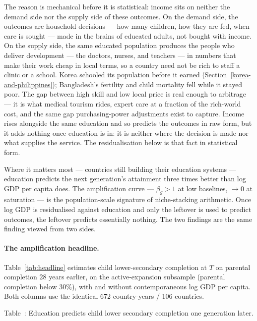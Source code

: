 \documentclass[12pt,letterpaper]{article}
\begin{document}
The reason is mechanical before it is statistical: income sits on
neither the demand side nor the supply side of these outcomes. On the demand side, the outcomes are
household decisions --- how many children, how they are fed, when care is
sought --- made in the brains of educated adults, not bought with income.
On the supply side, the same educated population produces the people who
deliver development --- the doctors, nurses, and teachers --- in numbers
that make their work cheap in local terms, so a country need not be rich
to staff a clinic or a school. Korea schooled its population before it
earned (Section~\ref{korea-and-philippines}); Bangladesh's fertility and
child mortality fell while it stayed poor. The gap between high skill and
low local price is real enough to arbitrage --- it is what medical
tourism rides, expert care at a fraction of the rich-world cost, and the
same gap purchasing-power adjustments exist to capture. Income rises
alongside the same education and so predicts the outcomes in raw form,
but it adds nothing once education is in: it is neither where the decision
is made nor what supplies the service. The residualisation below is that
fact in statistical form.

Where it matters most --- countries still building their education
systems --- education predicts the next generation's attainment three
times better than log GDP per capita does. The amplification curve
--- $\beta_g > 1$ at low baselines, $\to 0$ at saturation --- is the
population-scale signature of niche-stacking arithmetic. Once log
GDP is residualised against education and only the leftover is used
to predict outcomes, the leftover predicts essentially nothing. The
two findings are the same finding viewed from two sides.

\paragraph{The amplification headline.}
Table~\ref{tab:headline} estimates child lower-secondary completion at $T$
on parental completion 28 years earlier, on the active-expansion
subsample (parental completion below 30\%), with and without
contemporaneous log GDP per capita. Both columns use the identical 672
country-years / 106 countries.

\label{tab:headline}Table~\thetable: Education predicts child lower secondary completion one generation later.
\end{document}
